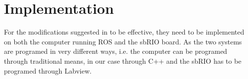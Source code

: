 \section{Implementation}

For the modifications suggested in  to be effective, they need to be implemented on both the computer running ROS and the sbRIO board. As the two systems are programed in very different ways, i.e. the computer can be programed through traditional means, in our case through C++ and the sbRIO has to be programed through Labview.
